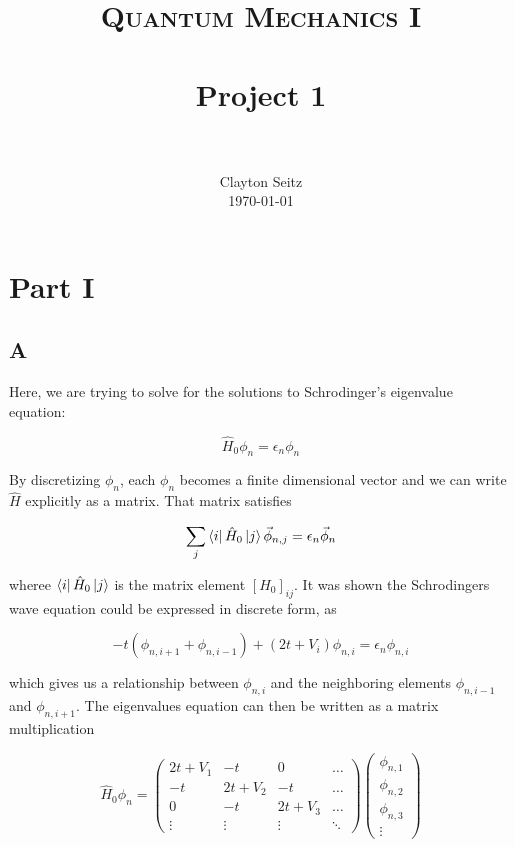 \documentclass[paper=a4, fontsize=11pt]{scrartcl}
\title{
		\usefont{OT1}{bch}{b}{n}
		\normalfont \normalsize \textsc{Quantum Mechanics I} \\ [25pt]
		\horrule{0.5pt} \\[0.4cm]
		\huge Project 1 \\
		\horrule{2pt} \\[0.5cm]
}
\author{
		\normalfont 								\normalsize
        Clayton Seitz\\[-3pt]		\normalsize
        \today
}
\date{}
\numberwithin{equation}{section}		%
\numberwithin{figure}{section}			%
\numberwithin{table}{section}				%
\begin{document}
\maketitle

\section{Part I}

\subsection{A}


Here, we are trying to solve for the solutions to Schrodinger's eigenvalue equation:

\begin{equation*}
\hat{H}_{0}\phi_{n} = \epsilon_{n}\phi_{n}
\end{equation*}

By discretizing $\phi_{n}$, each $\phi_{n}$ becomes a finite dimensional vector and we can write $\hat{H}$ explicitly as a matrix. That matrix satisfies

\begin{equation*}
\sum_{j}\bra{i}\hat{H}_{0}\ket{j}\vec{\phi}_{n,j} = \epsilon_{n}\vec{\phi}_{n}
\end{equation*}

wheree $\bra{i}\hat{H}_{0}\ket{j}$ is the matrix element $[H_{0}]_{ij}$. It was shown the Schrodingers wave equation could be expressed in discrete form, as

\begin{equation*}
-t(\phi_{n,i+1} + \phi_{n,i-1}) + (2t+V_{i})\phi_{n,i} = \epsilon_{n}\phi_{n,i}
\end{equation*}

which gives us a relationship between $\phi_{n,i}$ and the neighboring elements $\phi_{n,i-1}$ and $\phi_{n,i+1}$. The eigenvalues equation can then be written as a matrix multiplication

\begin{equation*}
\hat{H}_{0}\phi_{n} = \begin{pmatrix}
2t + V_{1} & -t & 0 & \hdots\\
-t & 2t + V_{2} & -t& \hdots\\
0 & -t & 2t + V_{3}& \hdots\\
\vdots & \vdots & \vdots & \ddots
\end{pmatrix}
\begin{pmatrix}
\phi_{n,1}\\
\phi_{n,2}\\
\phi_{n,3}\\
\vdots
\end{pmatrix}
\end{equation*}
\end{document}
